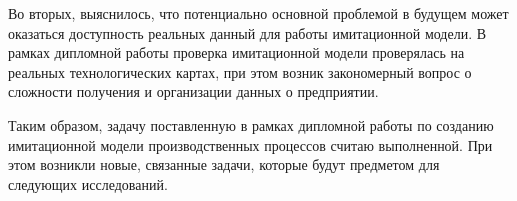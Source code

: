 Во вторых, выяснилось, что потенциально основной проблемой в будущем может оказаться доступность реальных данный для работы имитационной модели.
В рамках дипломной работы проверка имитационной модели проверялась на реальных технологических картах, при этом возник закономерный вопрос о сложности получения и организации данных о предприятии. 


Таким образом, задачу поставленную в рамках дипломной работы по созданию имитационной модели производственных процессов считаю выполненной. 
При этом возникли новые, связанные задачи, которые будут предметом для следующих исследований.